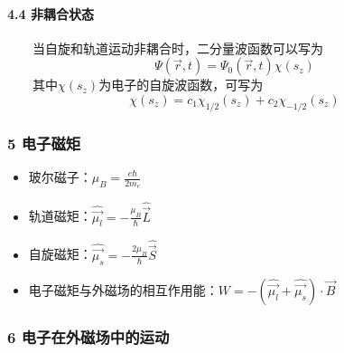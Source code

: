 \documentclass[UTF8,twocolumn]{ctexart}
\providecommand{\tightlist}{%
  \setlength{\itemsep}{0pt}\setlength{\parskip}{0pt}}
\let\oldparagraph\paragraph
\renewcommand{\paragraph}[1]{\oldparagraph{#1}\mbox{}}
\begin{document}
\hypertarget{ux975eux8026ux5408ux72b6ux6001}{%
\paragraph{ 4.4 非耦合状态}\label{ux975eux8026ux5408ux72b6ux6001}}

  当自旋和轨道运动非耦合时，二分量波函数可以写为
\[\Psi(\vec{r},t)=\Psi_0(\vec{r},t)\chi(s_z)\]
  其中\(\chi(s_z)\)为电子的自旋波函数，可写为
\[\chi(s_z)=c_1\chi_{1/2}(s_z)+c_2\chi_{-1/2}(s_z)\]

\hypertarget{ux7535ux5b50ux78c1ux77e9}{%
\subsubsection{5 电子磁矩}\label{ux7535ux5b50ux78c1ux77e9}}

\begin{itemize}
\tightlist
\item
  玻尔磁子：\(\mu_B=\frac{e\hbar}{2m_e}\)
\item
  轨道磁矩：\(\hat{\vec{\mu_l}}=-\frac{\mu_B}{\hbar}\hat{\vec{L}}\)
\item
  自旋磁矩：\(\hat{\vec{\mu_s}}=-\frac{2\mu_B}{\hbar}\hat{\vec{S}}\)
\item
  电子磁矩与外磁场的相互作用能：\(W=-(\hat{\vec{\mu_l}}+\hat{\vec{\mu_s}})\cdot\vec{B}\)
\end{itemize}

\hypertarget{ux7535ux5b50ux5728ux5916ux78c1ux573aux4e2dux7684ux8fd0ux52a8}{%
\subsubsection{6
电子在外磁场中的运动}\label{ux7535ux5b50ux5728ux5916ux78c1ux573aux4e2dux7684ux8fd0ux52a8}}
\end{document}
